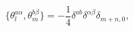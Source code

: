 \begin{equation}
  \{\theta^{a\alpha}_l,\theta^{b\beta}_m\}=
  -\frac{1}{4}\delta^{ab}\delta^{\alpha\beta}\delta_{m+n,0},
\end{equation}

